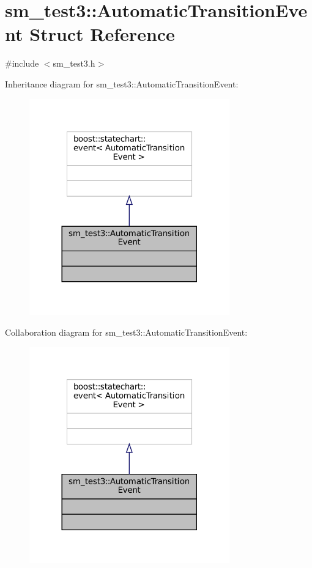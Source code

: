 \hypertarget{structsm__test3_1_1AutomaticTransitionEvent}{}\section{sm\+\_\+test3\+:\+:Automatic\+Transition\+Event Struct Reference}
\label{structsm__test3_1_1AutomaticTransitionEvent}


{\ttfamily \#include $<$sm\+\_\+test3.\+h$>$}



Inheritance diagram for sm\+\_\+test3\+:\+:Automatic\+Transition\+Event\+:
\nopagebreak
\begin{figure}[H]
\begin{center}
\leavevmode
\includegraphics[width=245pt]{structsm__test3_1_1AutomaticTransitionEvent__inherit__graph}
\end{center}
\end{figure}


Collaboration diagram for sm\+\_\+test3\+:\+:Automatic\+Transition\+Event\+:
\nopagebreak
\begin{figure}[H]
\begin{center}
\leavevmode
\includegraphics[width=245pt]{structsm__test3_1_1AutomaticTransitionEvent__coll__graph}
\end{center}
\end{figure}



